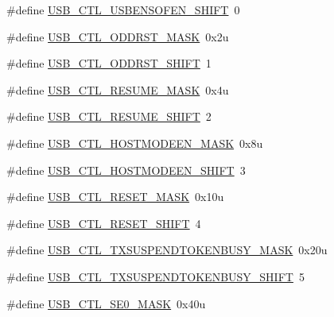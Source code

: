 \begin{DoxyCompactItemize}
\item 
\#define \hyperlink{group___u_s_b___register___masks_ga674ca18da1675b8ae48c65ca4203da36}{U\+S\+B\+\_\+\+C\+T\+L\+\_\+\+U\+S\+B\+E\+N\+S\+O\+F\+E\+N\+\_\+\+S\+H\+I\+FT}~0
\item 
\#define \hyperlink{group___u_s_b___register___masks_ga70907cc5c00bad68669ef02ec1332bfc}{U\+S\+B\+\_\+\+C\+T\+L\+\_\+\+O\+D\+D\+R\+S\+T\+\_\+\+M\+A\+SK}~0x2u
\item 
\#define \hyperlink{group___u_s_b___register___masks_ga6e2ea6a3166748c567d22a767c69f98d}{U\+S\+B\+\_\+\+C\+T\+L\+\_\+\+O\+D\+D\+R\+S\+T\+\_\+\+S\+H\+I\+FT}~1
\item 
\#define \hyperlink{group___u_s_b___register___masks_ga4e385fa5cf2157ef30a39c1c2b766cd3}{U\+S\+B\+\_\+\+C\+T\+L\+\_\+\+R\+E\+S\+U\+M\+E\+\_\+\+M\+A\+SK}~0x4u
\item 
\#define \hyperlink{group___u_s_b___register___masks_gab8354dafb3b0cb438770fe60ffec4714}{U\+S\+B\+\_\+\+C\+T\+L\+\_\+\+R\+E\+S\+U\+M\+E\+\_\+\+S\+H\+I\+FT}~2
\item 
\#define \hyperlink{group___u_s_b___register___masks_gaddf09c4e93070675c5c93c711518250c}{U\+S\+B\+\_\+\+C\+T\+L\+\_\+\+H\+O\+S\+T\+M\+O\+D\+E\+E\+N\+\_\+\+M\+A\+SK}~0x8u
\item 
\#define \hyperlink{group___u_s_b___register___masks_ga87a32a06006794e2dd638fd2bb2eb788}{U\+S\+B\+\_\+\+C\+T\+L\+\_\+\+H\+O\+S\+T\+M\+O\+D\+E\+E\+N\+\_\+\+S\+H\+I\+FT}~3
\item 
\#define \hyperlink{group___u_s_b___register___masks_ga6e3734900ace59f3dedf7a8f246721d7}{U\+S\+B\+\_\+\+C\+T\+L\+\_\+\+R\+E\+S\+E\+T\+\_\+\+M\+A\+SK}~0x10u
\item 
\#define \hyperlink{group___u_s_b___register___masks_gac709cb60252fd6ab2775785ffc2953e6}{U\+S\+B\+\_\+\+C\+T\+L\+\_\+\+R\+E\+S\+E\+T\+\_\+\+S\+H\+I\+FT}~4
\item 
\#define \hyperlink{group___u_s_b___register___masks_gaa2e78edccdce1268888d45bc4d81cfe1}{U\+S\+B\+\_\+\+C\+T\+L\+\_\+\+T\+X\+S\+U\+S\+P\+E\+N\+D\+T\+O\+K\+E\+N\+B\+U\+S\+Y\+\_\+\+M\+A\+SK}~0x20u
\item 
\#define \hyperlink{group___u_s_b___register___masks_gac6b9a4253ee9f3740d0c7b2692a44e8e}{U\+S\+B\+\_\+\+C\+T\+L\+\_\+\+T\+X\+S\+U\+S\+P\+E\+N\+D\+T\+O\+K\+E\+N\+B\+U\+S\+Y\+\_\+\+S\+H\+I\+FT}~5
\item 
\#define \hyperlink{group___u_s_b___register___masks_gac4c2c3ef09a72faaab7151297e8dfbe7}{U\+S\+B\+\_\+\+C\+T\+L\+\_\+\+S\+E0\+\_\+\+M\+A\+SK}~0x40u
\item 

\end{DoxyCompactItemize}
